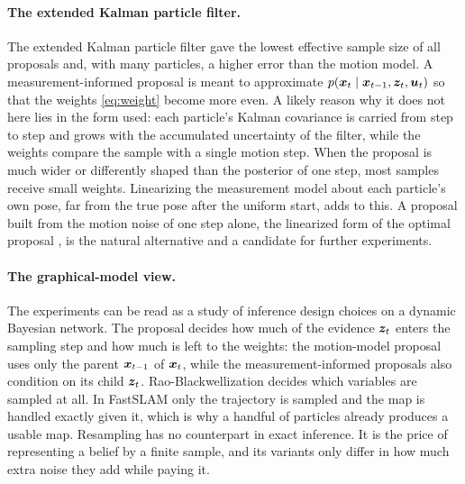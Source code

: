 \paragraph{The extended Kalman particle filter.} The extended Kalman particle filter gave the lowest effective sample size
of all proposals and, with many particles, a higher error than the motion model. A measurement-informed proposal is
meant to approximate $p(\bm{x}_t \mid \bm{x}_{t-1}, \bm{z}_t, \bm{u}_t)$ so that the weights \eqref{eq:weight} become more even. A likely
reason why it does not here lies in the form used: each particle's Kalman covariance is carried from step to step and
grows with the accumulated uncertainty of the filter, while the weights compare the sample with a single motion step. When the proposal is much
wider or differently shaped than the posterior of one step, most samples receive small weights. Linearizing the
measurement model about each particle's own pose, far from the true pose after the uniform start, adds to this. A
proposal built from the motion noise of one step alone, the linearized form of the optimal proposal
\cite{doucet2011tutorial}, is the natural alternative and a candidate for further experiments.

\paragraph{The graphical-model view.} The experiments can be read as a study of inference design choices on a dynamic
Bayesian network. The proposal decides how much of the evidence $\bm{z}_t$ enters the sampling step and how much is left
to the weights: the motion-model proposal uses only the parent $\bm{x}_{t-1}$ of $\bm{x}_t$, while the measurement-informed
proposals also condition on its child $\bm{z}_t$. Rao-Blackwellization decides which variables are sampled at all. In
FastSLAM only the trajectory is sampled and the map is handled exactly given it, which is why a handful of particles
already produces a usable map. Resampling has no counterpart in exact inference. It is the price of representing a
belief by a finite sample, and its variants only differ in how much extra noise they add while paying it.

